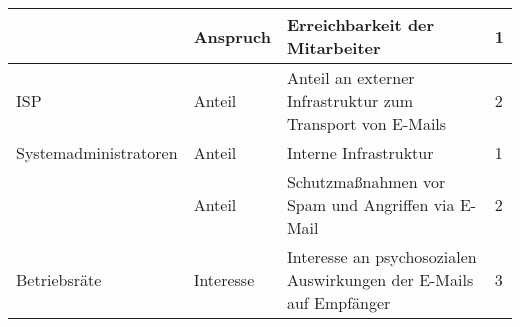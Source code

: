 \begin{table}[ht]
\begin{tabular}{|l|l|l|l|}
                                           & Anspruch           & Erreichbarkeit der Mitarbeiter                                     & 1                  \\ \hline
    ISP                                    & Anteil             & Anteil an externer Infrastruktur zum Transport von E-Mails         & 2                  \\ \hline
    Systemadministratoren & Anteil             & Interne Infrastruktur                                              & 1                  \\ \cline{2-4} 
                                           & Anteil             & Schutzmaßnahmen vor Spam und Angriffen via E-Mail                  & 2                  \\ \hline
    Betriebsräte                           & Interesse          & Interesse an psychosozialen Auswirkungen der E-Mails auf Empfänger & 3                  \\ \hline
    \end{tabular}
	\label{tab:stakeholderanalyse}
\end{table}
